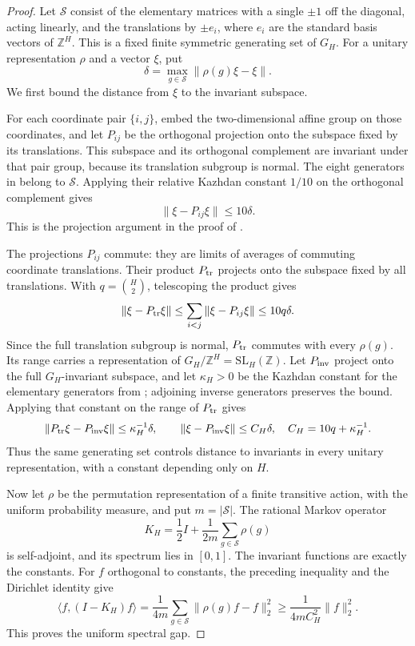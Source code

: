 \begin{proof}
Let $\mathcal S$ consist of the elementary matrices with a single
$\pm1$ off the diagonal, acting linearly, and the translations by
$\pm e_i$, where $e_i$ are the standard basis vectors of $\mathbb Z^H$.
This is a fixed finite symmetric generating set of $G_H$.
For a unitary representation $\rho$ and a vector $\xi$, put
\[
\delta=\max_{g\in\mathcal S}\|\rho(g)\xi-\xi\|.
\]
We first bound the distance from $\xi$ to the invariant subspace.

For each coordinate pair $\{i,j\}$, embed the two-dimensional affine
group on those coordinates, and let $P_{ij}$ be the orthogonal projection
onto the subspace fixed by its translations. This subspace and its
orthogonal complement are invariant under that pair group, because its
translation subgroup is normal. The eight generators in
\cite[Theorem~2.1, p.~152]{Shalom1999} belong to $\mathcal S$. Applying their
relative Kazhdan constant $1/10$ on the orthogonal complement gives
\[
\|\xi-P_{ij}\xi\|\le10\delta.
\]
This is the projection argument in the proof of
\cite[Corollary~2.3, p.~154]{Shalom1999}.

The projections $P_{ij}$ commute: they are limits of averages of
commuting coordinate translations. Their product $P_{\rm tr}$ projects onto
the subspace fixed by all translations. With $q=\binom H2$, telescoping
the product gives
\[
\|\xi-P_{\rm tr}\xi\|
\le\sum_{i<j}\|\xi-P_{ij}\xi\|
\le10q\delta.
\]
Since the full translation subgroup is normal, $P_{\rm tr}$ commutes
with every $\rho(g)$. Its range carries a representation of
$G_H/\mathbb Z^H=\mathrm{SL}_H(\mathbb Z)$. Let $P_{\rm inv}$ project onto the
full $G_H$-invariant subspace, and let $\kappa_H>0$ be the Kazhdan
constant for the elementary generators from
\cite[Theorem~2.6, p.~156]{Shalom1999}; adjoining inverse generators
preserves the bound. Applying that constant on the range of
$P_{\rm tr}$ gives
\[
\|P_{\rm tr}\xi-P_{\rm inv}\xi\|\le\kappa_H^{-1}\delta,
\qquad
\|\xi-P_{\rm inv}\xi\|\le C_H\delta,
\quad C_H=10q+\kappa_H^{-1}.
\]
Thus the same generating set controls distance to invariants in every
unitary representation, with a constant depending only on $H$.

Now let $\rho$ be the permutation representation of a finite transitive
action, with the uniform probability measure, and put $m=|\mathcal S|$.
The rational Markov operator
\[
K_H=\frac12I+\frac1{2m}\sum_{g\in\mathcal S}\rho(g)
\]
is self-adjoint, and its spectrum lies in $[0,1]$. The invariant
functions are exactly the constants. For $f$ orthogonal to constants,
the preceding inequality and the Dirichlet identity give
\[
\langle f,(I-K_H)f\rangle
=\frac1{4m}\sum_{g\in\mathcal S}\|\rho(g)f-f\|_2^2
\ge\frac1{4mC_H^2}\|f\|_2^2.
\]
This proves the uniform spectral gap.
\end{proof}

